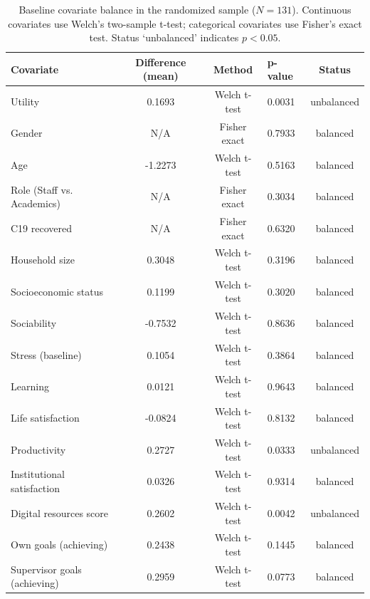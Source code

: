 \begin{table}

\caption{\label{tab:cov-balance}Baseline covariate balance in the randomized sample ($N=131$). Continuous covariates use Welch's two-sample t-test; categorical covariates use Fisher's exact test. Status `unbalanced' indicates $p < 0.05$.}
\centering
\begin{tabular}[t]{lcclc}
\toprule
Covariate & Difference (mean) & Method & p-value & Status\\
\midrule
Utility & 0.1693 & Welch t-test & 0.0031 & unbalanced\\
Gender & N/A & Fisher exact & 0.7933 & balanced\\
Age & -1.2273 & Welch t-test & 0.5163 & balanced\\
Role (Staff vs. Academics) & N/A & Fisher exact & 0.3034 & balanced\\
C19 recovered & N/A & Fisher exact & 0.6320 & balanced\\
Household size & 0.3048 & Welch t-test & 0.3196 & balanced\\
Socioeconomic status & 0.1199 & Welch t-test & 0.3020 & balanced\\
Sociability & -0.7532 & Welch t-test & 0.8636 & balanced\\
Stress (baseline) & 0.1054 & Welch t-test & 0.3864 & balanced\\
Learning & 0.0121 & Welch t-test & 0.9643 & balanced\\
Life satisfaction & -0.0824 & Welch t-test & 0.8132 & balanced\\
Productivity & 0.2727 & Welch t-test & 0.0333 & unbalanced\\
Institutional satisfaction & 0.0326 & Welch t-test & 0.9314 & balanced\\
Digital resources score & 0.2602 & Welch t-test & 0.0042 & unbalanced\\
Own goals (achieving) & 0.2438 & Welch t-test & 0.1445 & balanced\\
Supervisor goals (achieving) & 0.2959 & Welch t-test & 0.0773 & balanced\\
\bottomrule
\end{tabular}
\end{table}
